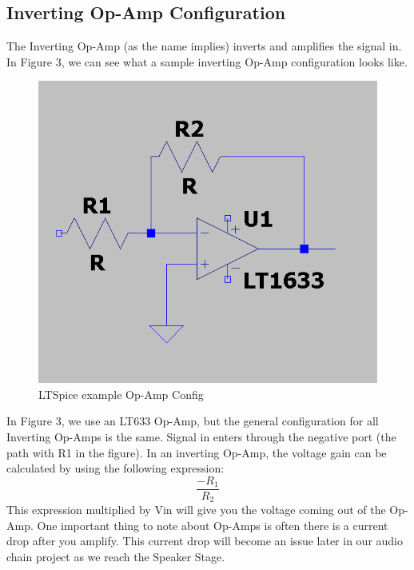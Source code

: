\documentclass[letterpaper,12pt]{article}
\begin{document}
\subsection{Inverting Op-Amp Configuration}
The Inverting Op-Amp (as the name implies) inverts and amplifies the signal in. In Figure 3, we can see what a sample inverting Op-Amp configuration looks like.
\begin{figure}
    \centering
    \includegraphics[scale=0.5]{op-amp2.PNG}
    \caption{LTSpice example Op-Amp Config}
\end{figure}
In Figure 3, we use an LT633 Op-Amp, but the general configuration for all Inverting Op-Amps is the same. Signal in enters through the negative port (the path with R1 in the figure). In an inverting Op-Amp, the voltage gain can be calculated by using the following expression:
\begin{equation}
   \frac{-R_1}{R_2}
   \label{Eq:Inverting} %
\end{equation}
This expression multiplied by Vin will give you the voltage coming out of the Op-Amp. One important thing to note about Op-Amps is often there is a current drop after you amplify. This current drop will become an issue later in our audio chain project as we reach the Speaker Stage.
\end{document}
